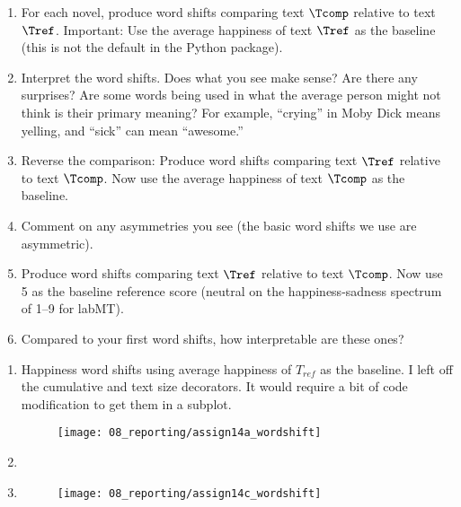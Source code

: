 \begin{enumerate}
  \begin{enumerate} 
  \item 
    For each novel,
    produce word shifts comparing text $\Tcomp$ relative to text $\Tref$.
    Important: Use the average happiness of text $\Tref$ as the baseline (this is not the default in the Python package).

  \item 
    Interpret the word shifts. Does what you see make sense?
    Are there any surprises?
    Are some words being used in what the average person might not think is their primary meaning?
    For example, ``crying'' in Moby Dick means yelling, and ``sick'' can mean ``awesome.''
  \item
    Reverse the comparison:
    Produce word shifts comparing text $\Tref$ relative to text $\Tcomp$.
    Now use the average happiness of text $\Tcomp$ as the baseline.
    
  \item
    Comment on any asymmetries you see (the basic word shifts we use are asymmetric).
  \item
    Produce word shifts comparing text $\Tref$ relative to text $\Tcomp$.
    Now use 5 as the baseline reference score (neutral on the happiness-sadness spectrum of 1--9 for labMT).
    
  \item
    Compared to your first word shifts, how interpretable are these ones?
  \end{enumerate}

  
   \solutionstart
	
	\begin{enumerate}
		\item 
		Happiness word shifts using average happiness of $T_{ref}$ as the baseline. I left off the cumulative and text size decorators. It would require a bit of code modification to get them in a subplot.
		
			\begin{figure}[H]
				\centering
				\texttt{[image: 08\_reporting/assign14a\_wordshift]}
				\label{fig:wordshift}
			\end{figure}
	
		\item 
		
		\item 

			\begin{figure}[H]
   				\centering
   				\texttt{[image: 08\_reporting/assign14c\_wordshift]}
   				\label{fig:wordshift_rev}
   			\end{figure}
	

\end{enumerate}
\end{enumerate}
